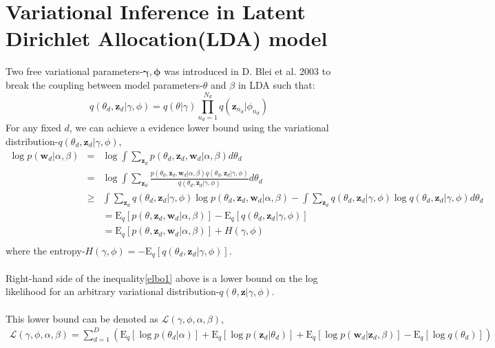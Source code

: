 \documentclass[a4paper]{article}
\newcommand{\be}{\begin{equation}}
\newcommand{\ee}{\end{equation}}
\newcommand{\bs}{\boldsymbol}
\newcommand{\ba}{\begin{array}}
\newcommand{\ea}{\end{array}}
\newcommand{\E}{\mathrm{E}}
\newcommand{\Sum}{\displaystyle\sum}
\newcommand{\Prod}{\displaystyle\prod}
\begin{document}
\section{Variational Inference in Latent Dirichlet Allocation(LDA) model}
Two free variational parameters-$\bs{\gamma},\bs{\phi}$ was introduced in D. Blei et al. 2003 to break the coupling between  model parameters-$\theta$ and $\beta$ in LDA such that:\\
\[
q(\theta_d,\bs{z}_d|\gamma,\phi)=q(\theta|\gamma)\Prod_{n_d=1}^{N_d}q(\bs{z}_{n_d}|\phi_{n_d})
\]
For any fixed $d$, we can achieve a evidence lower bound using the variational distribution-$q(\theta_d,\bs{z}_d|\gamma,\phi)$,\\
\be\label{elbo1}
\ba{rcl}
\log p(\bs{w}_d|\alpha,\beta)&=&\log\int\Sum_{
\bs{z}_d}p(\theta_d,\bs{z}_d,\bs{w}_d|\alpha,\beta)d\theta_d\\
&=&\log\int\Sum_{
	\bs{z}_d}\frac{p(\theta_d,\bs{z}_d,\bs{w}_d|\alpha,\beta)q(\theta_d,\bs{z}_d|\gamma,\phi)}{q(\theta_d,\bs{z}_d|\gamma,\phi)}d\theta_d\\
&\ge&\int\Sum_{
	\bs{z}_d}q(\theta_d,\bs{z}_d|\gamma,\phi)\log p(\theta_d,\bs{z}_d,\bs{w}_d|\alpha,\beta)-\int\Sum_{
	\bs{z}_d}q(\theta_d,\bs{z}_d|\gamma,\phi)\log q(\theta_d,\bs{z}_d|\gamma,\phi)d\theta_d\\
&&=\E_{q}[p(\theta,\bs{z}_d,\bs{w}_d|\alpha,\beta)]-\E_{q}[q(\theta_d,\bs{z}_d|\gamma,\phi)]\\
&&=\E_{q}[p(\theta,\bs{z}_d,\bs{w}_d|\alpha,\beta)]+H(\gamma,\phi)\\
\ea
\ee
where the entropy-$H(\gamma,\phi)=-\E_{q}[q(\theta_d,\bs{z}_d|\gamma,\phi)]$.\\
\\
Right-hand side of the inequality\ref{elbo1} above is a lower bound on the log likelihood for an arbitrary variational distribution-$q(\theta,\bs{z}|\gamma,\phi)$.\\
\\
This lower bound can be denoted as $\mathcal{L}(\gamma,\phi,\alpha,\beta)$,\\
\be\label{elbo2}
\ba{rcl}
\mathcal{L}(\gamma,\phi,\alpha,\beta)=\Sum_{d=1}^{D}\left(\E_{q}[\log p(\theta_d|\alpha)]+\E_{q}[\log p(\bs{z}_d|\theta_d)]+\E_{q}[\log p(\bs{w}_d|\bs{z}_d,\beta)]-\E_q[\log q(\theta_d)]\right)
\ea
\ee
\end{document}
